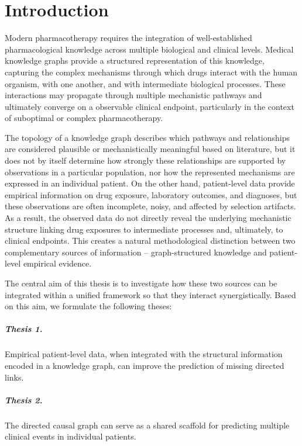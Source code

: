 \chapter{Introduction}
\label{ch:introduction}

Modern pharmacotherapy requires the integration of well-established pharmacological 
knowledge across multiple biological and clinical levels. Medical knowledge graphs provide a 
structured representation of this knowledge, capturing the complex mechanisms through 
which drugs interact with the human organism, with one another, and with intermediate 
biological processes. These interactions may propagate through multiple mechanistic pathways 
and ultimately converge on a observable clinical endpoint, particularly in the context of 
suboptimal or complex pharmacotherapy.

The topology of a knowledge graph describes which pathways and relationships are considered plausible or
mechanistically meaningful based on literature, but it does not by itself determine
how strongly these relationships are supported by observations in a particular population,
nor how the represented mechanisms are expressed in an individual patient.
On the other hand, patient-level data provide empirical information on drug exposure, laboratory 
outcomes, and diagnoses, but these observations are often incomplete, noisy, and 
affected by selection artifacts. As a result, the observed data do not directly reveal the 
underlying mechanistic structure linking drug exposures to intermediate processes and, ultimately, 
to clinical endpoints.
This creates a natural methodological distinction between two complementary sources of information
-- graph-structured knowledge and patient-level empirical evidence.

The central aim of this thesis is to investigate how these two sources can be integrated within
a unified framework so that they interact synergistically.
Based on this aim, we formulate the following theses:

\paragraph{Thesis 1.}
Empirical patient-level data, when integrated with the structural information encoded in a 
knowledge graph, can improve the prediction of missing directed links.

\paragraph{Thesis 2.}
The directed causal graph can serve as a shared scaffold for predicting multiple
clinical events in individual patients.

